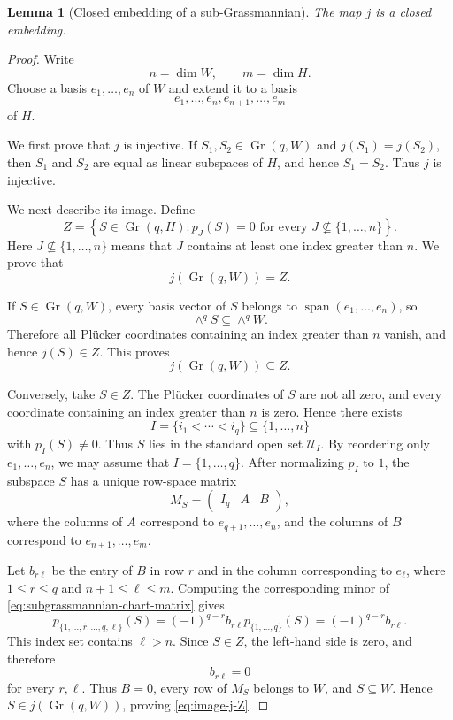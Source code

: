 \documentclass[10pt,a4paper]{amsart}
\newtheorem{lemma}{Lemma}
\newcommand{\Gr}{\operatorname{Gr}}
\newcommand{\Span}{\operatorname{span}}
\newcommand{\cU}{\mathcal U}
\begin{document}
\begin{lemma}[Closed embedding of a sub-Grassmannian]
\label{lem:subgrassmannian-closed}
The map $j$ is a closed embedding.
\end{lemma}

\begin{proof}
Write
\[
  n=\dim W,\qquad m=\dim H.
\]
Choose a basis $e_1,\ldots,e_n$ of $W$ and extend it to a basis
\[
  e_1,\ldots,e_n,e_{n+1},\ldots,e_m
\]
of $H$.

We first prove that $j$ is injective. If $S_1,S_2\in\Gr(q,W)$ and
$j(S_1)=j(S_2)$, then $S_1$ and $S_2$ are equal as linear subspaces of $H$,
and hence $S_1=S_2$. Thus $j$ is injective.

We next describe its image. Define
\begin{equation}\label{eq:Z-subgrassmannian}
  Z=\left\{
  S\in\Gr(q,H):
  p_J(S)=0\text{ for every }J\nsubseteq\{1,\ldots,n\}
  \right\}.
\end{equation}
Here $J\nsubseteq\{1,\ldots,n\}$ means that $J$ contains at least one index
greater than $n$. We prove that
\begin{equation}\label{eq:image-j-Z}
  j(\Gr(q,W))=Z.
\end{equation}

If $S\in\Gr(q,W)$, every basis vector of $S$ belongs to
$\Span(e_1,\ldots,e_n)$, so
\[
  \wedge^qS\subseteq\wedge^qW.
\]
Therefore all Pl\"ucker coordinates containing an index greater than $n$ vanish,
and hence $j(S)\in Z$. This proves
\[
  j(\Gr(q,W))\subseteq Z.
\]

Conversely, take $S\in Z$. The Pl\"ucker coordinates of $S$ are not all zero,
and every coordinate containing an index greater than $n$ is zero. Hence there
exists
\[
  I=\{i_1<\cdots<i_q\}\subseteq\{1,\ldots,n\}
\]
with $p_I(S)\neq0$. Thus $S$ lies in the standard open set $\cU_I$. By
reordering only $e_1,\ldots,e_n$, we may assume that
$I=\{1,\ldots,q\}$. After normalizing $p_I$ to $1$, the subspace $S$ has a
unique row-space matrix
\begin{equation}\label{eq:subgrassmannian-chart-matrix}
  M_S=
  \begin{pmatrix}
    I_q&A&B
  \end{pmatrix},
\end{equation}
where the columns of $A$ correspond to $e_{q+1},\ldots,e_n$, and the columns of
$B$ correspond to $e_{n+1},\ldots,e_m$.

Let $b_{r\ell}$ be the entry of $B$ in row $r$ and in the column corresponding
to $e_\ell$, where $1\leq r\leq q$ and $n+1\leq\ell\leq m$. Computing the
corresponding minor of \eqref{eq:subgrassmannian-chart-matrix} gives
\[
  p_{\{1,\ldots,\widehat r,\ldots,q,\ell\}}(S)
  =(-1)^{q-r}b_{r\ell}p_{\{1,\ldots,q\}}(S)
  =(-1)^{q-r}b_{r\ell}.
\]
This index set contains $\ell>n$. Since $S\in Z$, the left-hand side is zero,
and therefore
\[
  b_{r\ell}=0
\]
for every $r,\ell$. Thus $B=0$, every row of $M_S$ belongs to $W$, and
$S\subseteq W$. Hence $S\in j(\Gr(q,W))$, proving
\eqref{eq:image-j-Z}.


\end{proof}
\end{document}
